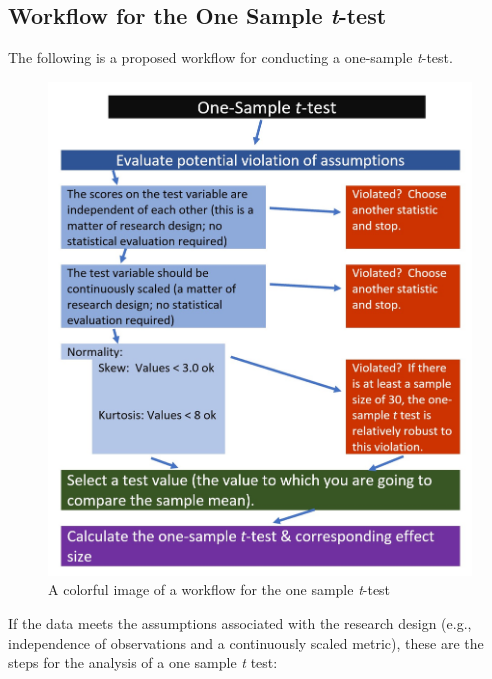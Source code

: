 \documentclass[
  11pt,
]{book}
\begin{document}
\hypertarget{workflow-for-the-one-sample-t-test}{%
\subsection{\texorpdfstring{Workflow for the One Sample \emph{t}-test}{Workflow for the One Sample t-test}}\label{workflow-for-the-one-sample-t-test}}

The following is a proposed workflow for conducting a one-sample \emph{t}-test.

\begin{figure}
\centering
\includegraphics{images/ttests/OneSampleWrkFlw.jpg}
\caption{A colorful image of a workflow for the one sample \emph{t}-test}
\end{figure}

If the data meets the assumptions associated with the research design (e.g., independence of observations and a continuously scaled metric), these are the steps for the analysis of a one sample \emph{t} test:
\end{document}
